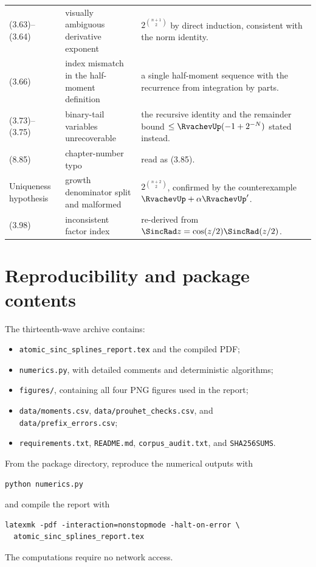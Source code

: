 \documentclass[11pt,oneside]{article}
\numberwithin{equation}{section}
\theoremstyle{definition}
\theoremstyle{remark}
\begin{document}
\begin{longtable}{@{}p{}p{}p{}@{}}
(3.63)--(3.64) & visually ambiguous derivative exponent & $2^{\binom{n+1}2}$
by direct induction, consistent with the norm identity.\\
(3.66) & index mismatch in the half-moment definition & a single
half-moment sequence with the recurrence from integration by parts.\\
(3.73)--(3.75) & binary-tail variables unrecoverable & the recursive
identity and the remainder bound $\le\RvachevUp(-1+2^{-N})$ stated instead.\\
(8.85) & chapter-number typo & read as (3.85).\\
Uniqueness hypothesis & growth denominator split and malformed &
$2^{\binom{n+2}2}$, confirmed by the counterexample $\RvachevUp+\alpha\RvachevUp'$.\\
(3.98) & inconsistent factor index & re-derived from
$\SincRad z=\cos(z/2)\SincRad(z/2)$.\\
\bottomrule
\end{longtable}

\section{Reproducibility and package contents}

The thirteenth-wave archive contains:
\begin{itemize}
\item \texttt{atomic\_sinc\_splines\_report.tex} and the compiled PDF;
\item \texttt{numerics.py}, with detailed comments and deterministic algorithms;
\item \texttt{figures/}, containing all four PNG figures used in the report;
\item \texttt{data/moments.csv}, \texttt{data/prouhet\_checks.csv}, and
\texttt{data/prefix\_errors.csv};
\item \texttt{requirements.txt}, \texttt{README.md},
\texttt{corpus\_audit.txt}, and \texttt{SHA256SUMS}.
\end{itemize}

From the package directory, reproduce the numerical outputs with
\begin{lstlisting}[style=repoPython]
python numerics.py
\end{lstlisting}
and compile the report with
\begin{lstlisting}[style=repoPython]
latexmk -pdf -interaction=nonstopmode -halt-on-error \
  atomic_sinc_splines_report.tex
\end{lstlisting}
The computations require no network access.
\end{document}
